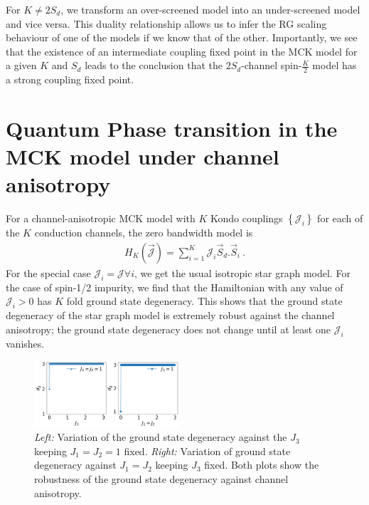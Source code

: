 \documentclass{iopart}
\begin{document}
For \(K \neq 2S_d\), we transform an over-screened model into an under-screened model and vice versa. This duality relationship allows us to infer the RG scaling behaviour of one of the models if we know that of the other. Importantly, we see that the existence of an intermediate coupling fixed point in the MCK model for a given \(K\) and \(S_d\) leads to the conclusion that the \(2S_d\)-channel spin-\(\frac{K}{2}\) model has a strong coupling fixed point.

\section{Quantum Phase transition in the MCK model under channel anisotropy}
\label{anisotropic_rg}

For a channel-anisotropic MCK model with \(K\) Kondo couplings \(\left\{\mathcal{J}_i\right\}\) for each of the \(K\) conduction channels, the zero bandwidth model is 
\begin{eqnarray}
H_K (\vec{{\mathcal{J}}}) = \sum_{i=1}^{K} {\mathcal{J}}_i\vec{S}_d.\vec{S}_i~.
\label{eq:anisotropy}
\end{eqnarray}
For the special case $\mathcal{J}_i=\mathcal{J} \forall i$, we get the usual isotropic star graph model. For the case of spin-1/2 impurity, we find that the Hamiltonian with any value of $\mathcal{J}_i>0$ has $K$ fold ground state degeneracy. This shows that the ground state degeneracy of the star graph model is extremely robust against the channel anisotropy; the ground state degeneracy does not change until at least one \(\mathcal{J}_i\) vanishes.
\begin{figure}
\centering
\includegraphics[width=0.48\textwidth]{AnisotropyChannel3.png}
\caption{\textit{Left:} Variation of the ground state degeneracy against the $J_3$ keeping $J_1=J_2=1$ fixed. \textit{Right:} Variation of ground state degeneracy against $J_1=J_2$ keeping $J_3$ fixed. Both plots show the robustness of the ground state degeneracy against channel anisotropy.}
\label{fig:channel-anisotropy-}
\end{figure}
\end{document}

